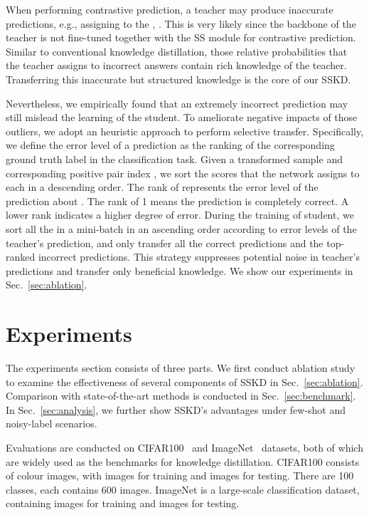 \documentclass[runningheads]{llncs}
\newcommand{\eg}{e.g.}
\begin{document}
When performing contrastive prediction, a teacher may produce inaccurate predictions, \eg, assigning  to the , . This is very likely since the backbone of the teacher is not fine-tuned together with the SS module for contrastive prediction. 
Similar to conventional knowledge distillation, those relative probabilities that the teacher assigns to incorrect answers contain rich knowledge of the teacher. 
Transferring this inaccurate but structured knowledge is the core of our SSKD.

Nevertheless, we empirically found that an extremely incorrect prediction may still mislead the learning of the student. To ameliorate negative impacts of those outliers, we adopt an heuristic approach to perform selective transfer. Specifically, we define the error level of a prediction as the ranking of the corresponding ground truth label in the classification task. Given a transformed sample  and corresponding positive pair index , we sort the scores that the network assigns to each  in a descending order. The rank of  represents the error level of the prediction about . The rank of 1 means the prediction is completely correct. A lower rank indicates a higher degree of error.
During the training of student, we sort all the  in a mini-batch in an ascending order according to error levels of the teacher's prediction, and only transfer all the correct predictions and the top- ranked incorrect predictions. This strategy suppresses potential noise in teacher's predictions and transfer only beneficial knowledge. We show our experiments in Sec.~\ref{sec:ablation}.



 


\section{Experiments}

The experiments section consists of three parts. We first conduct ablation study to examine the effectiveness of several components of SSKD in Sec.~\ref{sec:ablation}. Comparison with state-of-the-art methods is conducted in Sec.~\ref{sec:benchmark}. In Sec.~\ref{sec:analysis}, we further show SSKD's advantages under few-shot and noisy-label scenarios. 

Evaluations are conducted on CIFAR100~\cite{cifar100} and ImageNet~\cite{imagenet} datasets, both of which are widely used as the benchmarks for knowledge distillation. CIFAR100 consists of   colour images, with  images for training and  images for testing. There are 100 classes, each contains 600 images. ImageNet is a large-scale classification dataset, containing  images for training and  images for testing.
\end{document}
